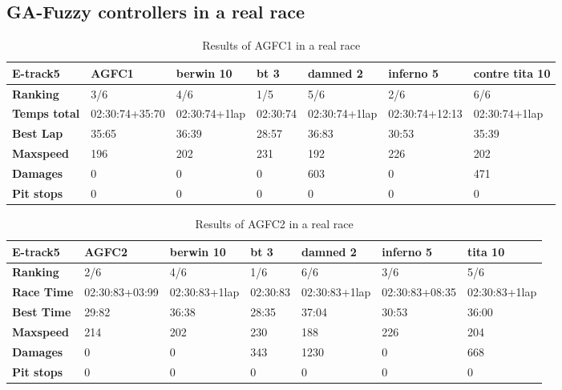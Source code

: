 \documentclass[runningheads,a4paper]{llncs}
\begin{document}
\subsection{GA-Fuzzy controllers in a real race}
\begin{table}[!ht]
	\caption{Results of AGFC1 in a real race}
	\label{14}
	\begin{tabular}{|p{2.3cm}|p{1.75 cm}|p{1.75 cm}|p{1.75 cm}|p{1.75 cm}|p{1.75 cm}|p{1.75 cm}|}
		\hline \textbf{E-track5} &   \textbf{AGFC1} & \textbf{berwin 10} & \textbf{bt 3} &\textbf{damned 2} & \textbf{inferno 5} & \textbf{contre tita 10}  \\
		\hline \textbf{Ranking} & 3/6&4/6&1/5&5/6&2/6&6/6\\			
		\hline \textbf{Temps total}	& 02:30:74\newline+35:70&02:30:74\newline+1lap&02:30:74&02:30:74\newline+1lap&02:30:74\newline+12:13&02:30:74\newline+1lap\\	
		\hline \textbf{Best Lap}&35:65& 36:39&28:57&36:83&30:53&35:39\\	
		\hline \textbf{Maxspeed}& 196&202&231&192&226&202\\	
		\hline \textbf{Damages}& 0&0&0&603&0&471 \\	
		\hline \textbf{Pit stops} & 0&0&0&0&0&0\\	 
		\hline 
	\end{tabular}
\end{table}
\begin{table}[!ht]
	\caption{Results of AGFC2 in a real race }
	\label{15}
	\begin{tabular}{|p{2.3cm}|p{1.75 cm}|p{1.75 cm}|p{1.75 cm}|p{1.75 cm}|p{1.75 cm}|p{1.75 cm}|}
		\hline \textbf{E-track5} & \textbf{AGFC2}&\textbf{berwin 10} & \textbf{bt 3} &\textbf{damned 2} & \textbf{inferno 5} & \textbf{tita 10}  \\
		\hline \textbf{Ranking} & 2/6&4/6&1/6&6/6&3/6&5/6\\			
		\hline \textbf{Race Time}	& 02:30:83\newline +03:99&  02:30:83\newline+1lap&02:30:83&02:30:83\newline+1lap&02:30:83\newline+08:35&02:30:83\newline+1lap\\	
		\hline \textbf{Best Time}& 29:82 &36:38&28:35&37:04&30:53&36:00\\	
		\hline \textbf{Maxspeed}& 214&202&230&188&226&204\\	
		\hline \textbf{Damages}& 0& 0 & 343&1230&0&668\\	
		\hline \textbf{Pit stops} &0&0&0&0&0&0 \\ 
		\hline 
	\end{tabular}
\end{table}
\end{document}
